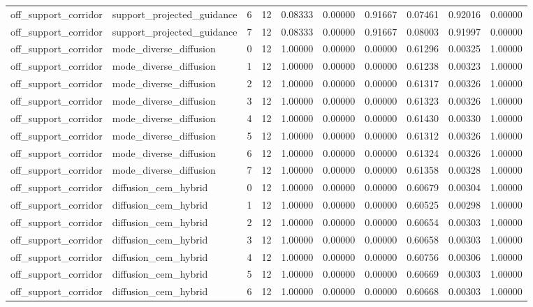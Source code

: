 \documentclass{article}
\begin{document}
\begin{table}[tbp]
{\begin{tabular}{llllllllll}
off\_support\_corridor & support\_projected\_guidance & 6 & 12 & 0.08333 & 0.00000 & 0.91667 & 0.07461 & 0.92016 & 0.00000 \\
off\_support\_corridor & support\_projected\_guidance & 7 & 12 & 0.08333 & 0.00000 & 0.91667 & 0.08003 & 0.91997 & 0.00000 \\
off\_support\_corridor & mode\_diverse\_diffusion & 0 & 12 & 1.00000 & 0.00000 & 0.00000 & 0.61296 & 0.00325 & 1.00000 \\
off\_support\_corridor & mode\_diverse\_diffusion & 1 & 12 & 1.00000 & 0.00000 & 0.00000 & 0.61238 & 0.00323 & 1.00000 \\
off\_support\_corridor & mode\_diverse\_diffusion & 2 & 12 & 1.00000 & 0.00000 & 0.00000 & 0.61317 & 0.00326 & 1.00000 \\
off\_support\_corridor & mode\_diverse\_diffusion & 3 & 12 & 1.00000 & 0.00000 & 0.00000 & 0.61323 & 0.00326 & 1.00000 \\
off\_support\_corridor & mode\_diverse\_diffusion & 4 & 12 & 1.00000 & 0.00000 & 0.00000 & 0.61430 & 0.00330 & 1.00000 \\
off\_support\_corridor & mode\_diverse\_diffusion & 5 & 12 & 1.00000 & 0.00000 & 0.00000 & 0.61312 & 0.00326 & 1.00000 \\
off\_support\_corridor & mode\_diverse\_diffusion & 6 & 12 & 1.00000 & 0.00000 & 0.00000 & 0.61324 & 0.00326 & 1.00000 \\
off\_support\_corridor & mode\_diverse\_diffusion & 7 & 12 & 1.00000 & 0.00000 & 0.00000 & 0.61358 & 0.00328 & 1.00000 \\
off\_support\_corridor & diffusion\_cem\_hybrid & 0 & 12 & 1.00000 & 0.00000 & 0.00000 & 0.60679 & 0.00304 & 1.00000 \\
off\_support\_corridor & diffusion\_cem\_hybrid & 1 & 12 & 1.00000 & 0.00000 & 0.00000 & 0.60525 & 0.00298 & 1.00000 \\
off\_support\_corridor & diffusion\_cem\_hybrid & 2 & 12 & 1.00000 & 0.00000 & 0.00000 & 0.60654 & 0.00303 & 1.00000 \\
off\_support\_corridor & diffusion\_cem\_hybrid & 3 & 12 & 1.00000 & 0.00000 & 0.00000 & 0.60658 & 0.00303 & 1.00000 \\
off\_support\_corridor & diffusion\_cem\_hybrid & 4 & 12 & 1.00000 & 0.00000 & 0.00000 & 0.60756 & 0.00306 & 1.00000 \\
off\_support\_corridor & diffusion\_cem\_hybrid & 5 & 12 & 1.00000 & 0.00000 & 0.00000 & 0.60669 & 0.00303 & 1.00000 \\
off\_support\_corridor & diffusion\_cem\_hybrid & 6 & 12 & 1.00000 & 0.00000 & 0.00000 & 0.60668 & 0.00303 & 1.00000 \\

\end{tabular}}
\end{table}
\end{document}
